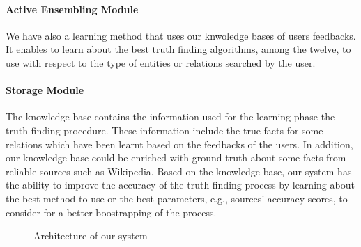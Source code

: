 \paragraph*{Active Ensembling Module} We have also a learning method that uses our knwoledge
bases of users feedbacks. It enables to learn about the best truth finding algorithms,
among the twelve, to use with respect to the type of entities or relations searched by 
the user.

\paragraph*{Storage Module}The knowledge base contains the information used for the learning
phase the truth finding procedure. These information include the true facts for some relations
which have been learnt based on the feedbacks of the users. In addition, our knowledge base could
be enriched with ground truth about some facts from reliable sources such as Wikipedia. Based on 
the knowledge base, our system has the ability to improve the accuracy of the truth finding process
by learning about the best method to use or the best parameters, e.g., sources' accuracy scores, to 
consider for a better boostrapping of the process.

\begin{figure}[ht]
\caption{Architecture of our system}\label{system_architecture}
\end{figure}

